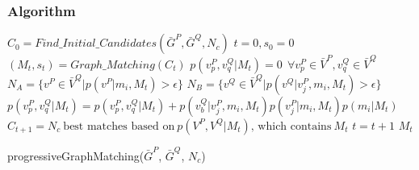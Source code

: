 \documentclass[hyperref={pdfpagelabels=false}]{beamer}
\begin{document}
\begin{frame}
\frametitle{Algorithm}

\begin{algorithm}[H]
	\fontsize{9pt}{6}\selectfont
				\begin{algorithmic}[1]
				
				\STATE $C_0=Find\_Initial\_Candidates(\bar{G}^P, \bar{G}^Q, N_c)$
				\STATE $t=0, s_0 = 0$
					\STATE $(M_t,s_t)=Graph\_Matching(C_t)$ 
					\STATE $p(v_p^P,v_q^Q|M_t)=0\ \ \forall v_p^P\in \bar{V}^P, v_q^Q\in \bar{V}^Q$
						\STATE $N_A=\{v^P\in \bar{V}^Q| p(v^P|m_i, M_t)>\epsilon\}$
							\STATE $N_B=\{v^Q\in \bar{V}^Q| p(v^Q|v_j^P, m_i, M_t)>\epsilon\}$
								\STATE $p(v_p^P,v_q^Q|M_t)=p(v_p^P,v_q^Q|M_t)+
								p(v_b^Q|v_j^P, m_i,M_t)p(v_j^P|m_i,M_t)p(m_i|M_t)$
							\ENDFOR
						\ENDFOR
					\ENDFOR
					\STATE $C_{t+1}=N_c\ \mbox{best matches based on}\  p(V^P,V^Q|M_t)\mbox{, which contains}\ M_t$
					\STATE $t=t+1$
				\ENDWHILE
				\RETURN $M_t$
				
				\end{algorithmic}
				\caption{progressiveGraphMatching($\bar{G}^P$, $\bar{G}^Q$, $N_c$) \cite{MinsuCho}}
			\end{algorithm}
	\end{frame}
\end{document}
